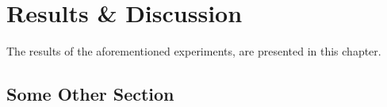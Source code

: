 \chapter{Results \& Discussion}

The results of the aforementioned experiments, are presented in this chapter.  




\section{Some Other Section}
